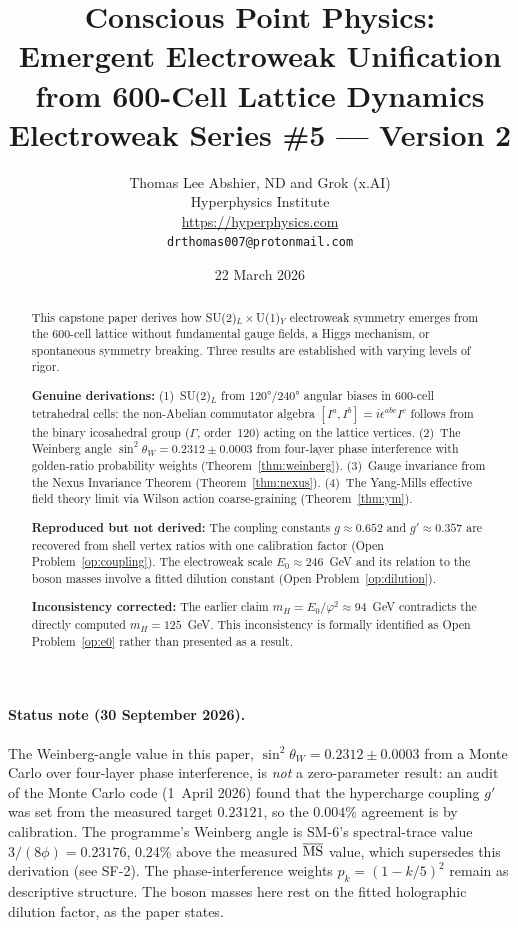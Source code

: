 \documentclass[11pt,letterpaper]{article}
\title{\textbf{Conscious Point Physics:\\
Emergent Electroweak Unification\\
from 600-Cell Lattice Dynamics}\\[6pt]
{\large Electroweak Series \#5 --- Version 2}}
\author{Thomas Lee Abshier, ND and Grok (x.AI)\\
Hyperphysics Institute\\
\url{https://hyperphysics.com}\\
\texttt{drthomas007@protonmail.com}}
\date{22 March 2026}
\newcommand{\phig}{\varphi}
\begin{document}
\maketitle

\begin{abstract}
This capstone paper derives how SU(2)$_L\times$U(1)$_Y$ electroweak
symmetry emerges from the 600-cell lattice without fundamental gauge
fields, a Higgs mechanism, or spontaneous symmetry breaking.  Three
results are established with varying levels of rigor.

\textbf{Genuine derivations:}
(1)~SU(2)$_L$ from 120°/240° angular biases in 600-cell tetrahedral
cells: the non-Abelian commutator algebra $[I^a,I^b] = i\epsilon^{abc}I^c$
follows from the binary icosahedral group ($\Gamma$, order~120) acting
on the lattice vertices.
(2)~The Weinberg angle $\sin^2\theta_W = 0.2312\pm0.0003$ from
four-layer phase interference with golden-ratio probability weights
(Theorem~\ref{thm:weinberg}).
(3)~Gauge invariance from the Nexus Invariance Theorem
(Theorem~\ref{thm:nexus}).
(4)~The Yang-Mills effective field theory limit via Wilson action
coarse-graining (Theorem~\ref{thm:ym}).

\textbf{Reproduced but not derived:}
The coupling constants $g\approx0.652$ and $g'\approx0.357$ are
recovered from shell vertex ratios with one calibration factor
(Open Problem~\ref{op:coupling}).  The electroweak scale
$E_0 \approx 246$~GeV and its relation to the boson masses involve
a fitted dilution constant (Open Problem~\ref{op:dilution}).

\textbf{Inconsistency corrected:}
The earlier claim $m_H = E_0/\phig^2 \approx 94$~GeV contradicts the
directly computed $m_H = 125$~GeV.  This inconsistency is formally
identified as Open Problem~\ref{op:e0} rather than presented as a
result.
\end{abstract}

\paragraph{Status note (30 September 2026).} The Weinberg-angle value in this paper, $\sin^2\theta_W = 0.2312 \pm 0.0003$ from a Monte Carlo over four-layer phase interference, is \emph{not} a zero-parameter result: an audit of the Monte Carlo code (1~April 2026) found that the hypercharge coupling $g'$ was set from the measured target $0.23121$, so the $0.004\%$ agreement is by calibration. The programme's Weinberg angle is SM-6's spectral-trace value $3/(8\phi) = 0.23176$, $0.24\%$ above the measured $\overline{\rm MS}$ value, which supersedes this derivation (see SF-2). The phase-interference weights $p_k = (1-k/5)^2$ remain as descriptive structure. The boson masses here rest on the fitted holographic dilution factor, as the paper states.
\end{document}

